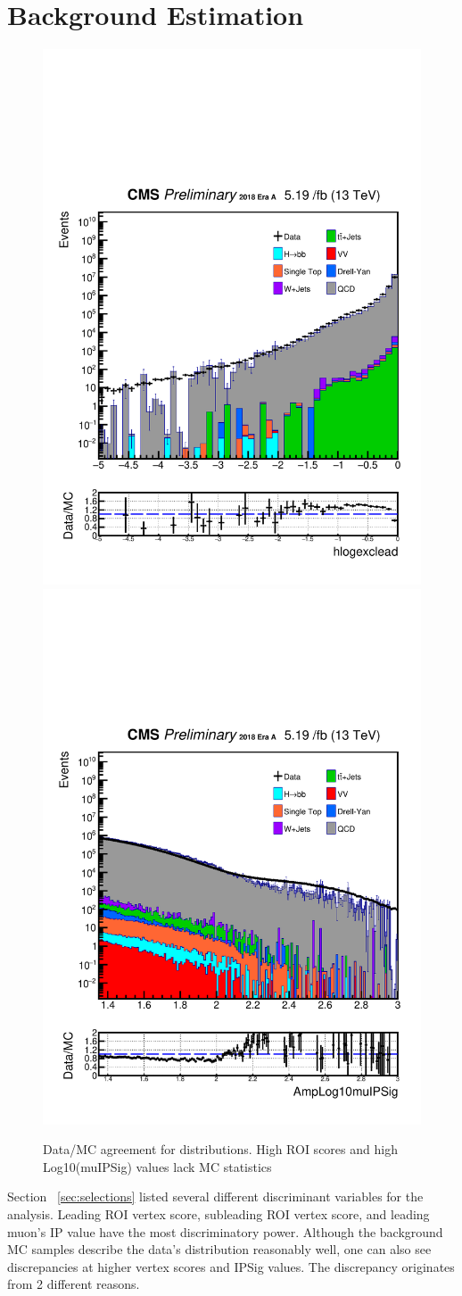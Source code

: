 \clearpage
\chapter{Background Estimation}\label{sec:estimate}

\begin{figure}[h!]
	\caption{Data/MC agreement for distributions. High ROI scores and high Log10(muIPSig) values lack MC statistics}
  \label{fig:DataMCscore5}
  \centering
  \includegraphics[width=0.40\linewidth]{figs/Data_log_Oct6ANVars_MS-15_ctauS-10_hlogexclead.pdf}
  \includegraphics[width=0.40\linewidth]{figs/Data_log_Oct6ANVars_MS-15_ctauS-10_AmpLog10muIPSig.pdf}

\end{figure}
Section ~\ref{sec:selections} listed several different discriminant variables for the analysis.
Leading ROI vertex score, subleading ROI vertex score, and leading muon's IP value have the most discriminatory power.
Although the background MC samples describe the data's distribution reasonably well, one can also see discrepancies at higher vertex scores and IPSig values.
The discrepancy originates from 2 different reasons.
